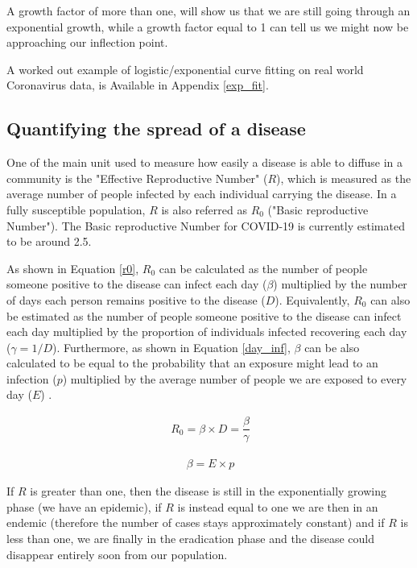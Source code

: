 A growth factor of more than one, will show us that we are still going through an exponential growth, while a growth factor equal to 1 can tell us we might now be approaching our inflection point.

A worked out example of logistic/exponential curve fitting on real world Coronavirus data, is Available in Appendix \ref{exp_fit}.

\subsection{Quantifying the spread of a disease}
One of the main unit used to measure how easily a disease is able to diffuse in a community is the "Effective Reproductive Number" ($R$), which is measured as the average number of people infected by each individual carrying the disease. In a fully susceptible population, $R$ is also referred as $R_{0}$ ("Basic reproductive Number"). The Basic reproductive Number for COVID-19 is currently estimated to be around 2.5.

As shown in Equation \ref{r0}, $R_{0}$ can be calculated as the number of people someone positive to the disease can infect each day ($\beta$) multiplied by the number of days each person remains positive to the disease ($D$). Equivalently, $R_{0}$ can also be estimated as the number of people someone positive to the disease can infect each day multiplied by the proportion of individuals infected recovering each day ($\gamma = 1/D$). Furthermore, as shown in Equation \ref{day_inf}, $\beta$ can be also calculated to be equal to the probability that an exposure might lead to an infection ($p$) multiplied by the average number of people we are exposed to every day ($E$) \cite{tds}.

\useshortskip
\begin{align}
\ R_{0} = \beta \times D = \dfrac{\beta}{\gamma}
\label{r0}
\end{align}
\useshortskip

\useshortskip
\begin{align}
\ \beta = E \times p
\label{day_inf}
\end{align}
\useshortskip

If $R$ is greater than one, then the disease is still in the exponentially growing phase (we have an epidemic), if $R$ is instead equal to one we are then in an endemic (therefore the number of cases stays approximately constant) and if $R$ is less than one, we are finally in the eradication phase and the disease could disappear entirely soon from our population.

